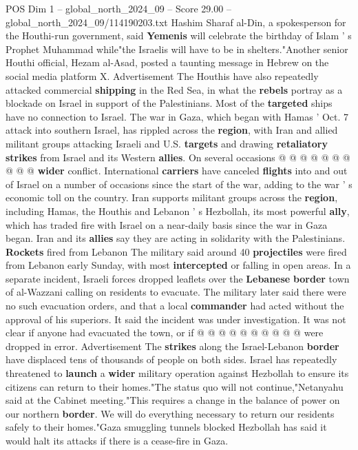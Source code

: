 \begin{textsample}{POS Dim 1 – global\_north\_2024\_09 – Score 29.00 – global\_north\_2024\_09/114190203.txt}
Hashim Sharaf al-Din, a spokesperson for the Houthi-run government, said \textbf{Yemenis} will celebrate the birthday of Islam ' s Prophet Muhammad while"the Israelis will have to be in shelters."Another senior Houthi official, Hezam al-Asad, posted a taunting message in Hebrew on the social media platform X.
Advertisement The Houthis have also repeatedly attacked commercial \textbf{shipping} in the Red Sea, in what the \textbf{rebels} portray as a blockade on Israel in support of the Palestinians.
Most of the \textbf{targeted} ships have no connection to Israel.
The war in Gaza, which began with Hamas ' Oct. 7 attack into southern Israel, has rippled across the \textbf{region}, with Iran and allied militant groups attacking Israeli and U.S. \textbf{targets} and drawing \textbf{retaliatory} \textbf{strikes} from Israel and its Western \textbf{allies}.
On several occasions @ @ @ @ @ @ @ @ @ @ \textbf{wider} conflict.
International \textbf{carriers} have canceled \textbf{flights} into and out of Israel on a number of occasions since the start of the war, adding to the war ' s economic toll on the country.
Iran supports militant groups across the \textbf{region}, including Hamas, the Houthis and Lebanon ' s Hezbollah, its most powerful \textbf{ally}, which has traded fire with Israel on a near-daily basis since the war in Gaza began.
Iran and its \textbf{allies} say they are acting in solidarity with the Palestinians. \textbf{Rockets} fired from Lebanon The military said around 40 \textbf{projectiles} were fired from Lebanon early Sunday, with most \textbf{intercepted} or falling in open areas.
In a separate incident, Israeli forces dropped leaflets over the \textbf{Lebanese} \textbf{border} town of al-Wazzani calling on residents to evacuate.
The military later said there were no such evacuation orders, and that a local \textbf{commander} had acted without the approval of his superiors.
It said the incident was under investigation.
It was not clear if anyone had evacuated the town, or if @ @ @ @ @ @ @ @ @ @ were dropped in error.
Advertisement The \textbf{strikes} along the Israel-Lebanon \textbf{border} have displaced tens of thousands of people on both sides.
Israel has repeatedly threatened to \textbf{launch} a \textbf{wider} military operation against Hezbollah to ensure its citizens can return to their homes."The status quo will not continue,"Netanyahu said at the Cabinet meeting."This requires a change in the balance of power on our northern \textbf{border}.
We will do everything necessary to return our residents safely to their homes."Gaza smuggling tunnels blocked Hezbollah has said it would halt its attacks if there is a cease-fire in Gaza.

\end{textsample}
